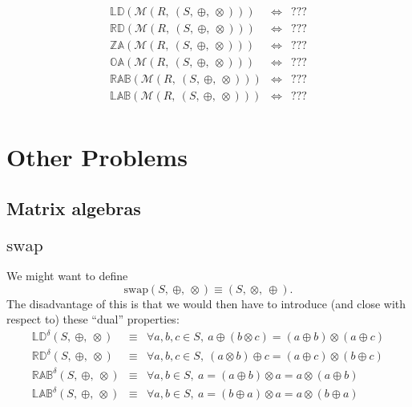 \documentclass[10pt]{article}
\newcommand{\propname}[1]{{\mathbb{#1}}}
\begin{document}
\[
\begin{array}{rcl} 
\propname{LD}(\mathcal{M}(R,\ (S,\ \oplus,\ \otimes))) 
    & \Leftrightarrow 
    & ???
    \\ 
\propname{RD}(\mathcal{M}(R,\ (S,\ \oplus,\ \otimes))) 
    & \Leftrightarrow 
    & ???
    \\ 
\propname{ZA}(\mathcal{M}(R,\ (S,\ \oplus,\ \otimes))) 
    & \Leftrightarrow 
    & ???
    \\ 
\propname{OA}(\mathcal{M}(R,\ (S,\ \oplus,\ \otimes))) 
    & \Leftrightarrow 
    & ???
    \\ 
\propname{RAB}(\mathcal{M}(R,\ (S,\ \oplus,\ \otimes))) 
    & \Leftrightarrow 
    & ???
    \\ 
\propname{LAB}(\mathcal{M}(R,\ (S,\ \oplus,\ \otimes))) 
    & \Leftrightarrow 
    & ???
    \\ 
\end{array} 
\] 

\section{Other Problems} 

\subsection{Matrix algebras}

\subsection{$\mathrm{swap}$}

We might want to define 
\[ 
\mathrm{swap}(S,\ \oplus,\ \otimes)   
   \equiv 
   (S,\ \otimes,\ \oplus). 
\] 
The disadvantage of this is that we would then have to introduce 
(and close with respect to) these ``dual'' properties:  
\[ 
\begin{array}{rcl} 
\propname{LD}^\delta(S,\ \oplus,\ \otimes) 
    & \equiv 
    & \forall a, b, c \in S,\ a\oplus(b \otimes c) =  (a\oplus b) \otimes (a\oplus c) \\ 
\propname{RD}^\delta(S,\ \oplus,\ \otimes)  
    & \equiv 
    & \forall a, b, c \in S,\ (a\otimes b)\oplus c  =   (a\oplus c) \otimes (b\oplus c)\\ 
\propname{RAB}^\delta(S,\ \oplus,\ \otimes) 
    & \equiv 
    & \forall a, b\in S,\ a =  (a\oplus b) \otimes a = a \otimes (a \oplus b) \\ 
\propname{LAB}^\delta(S,\ \oplus,\ \otimes) 
    & \equiv 
    & \forall a, b\in S,\ a =  (b\oplus a) \otimes a = a \otimes (b \oplus a) 
\end{array} 
\] 
\end{document}
